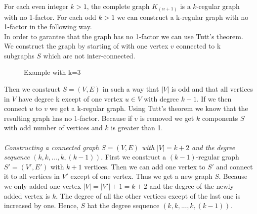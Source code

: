 \documentclass[a4paper]{article}
\begin{document}
	\newpage
	\begin{solution}{11}
		For each even integer $k > 1$, the complete graph $K_{(n+1)}$ is a $k$-regular graph with no 1-factor. 
		For each odd $k > 1$ we can construct a k-regular graph with no 1-factor in the following way. \\
		In order to garantee that the graph has no 1-factor we can use Tutt's theorem. 
		We construct the graph by starting of with one vertex $v$ connected to k subgraphs $S$ which are not inter-connected. 
		\begin{figure}[h]
			\centering
		\caption{Example with k=3}
		\end{figure}
		Then we construct $S=(V,E)$ in such a way that $|V|$ is odd and that all vertices in $V$ have degree k except of one vertex $u \in V$ with degree $k-1$. 
		If we then connect $u$ to $v$ we get a k-regular graph. 
		Using Tutt's theorem we know that the resulting graph has no 1-factor. 
		Because if $v$ is removed we get $k$ components $S$ with odd number of vertices and $k$ is greater than 1.\\ \\
		
		\emph{Constructing a connected graph $S=(V,E)$ with $|V|=k+2$ and the degree sequence $( k,k,...,k,(k-1))$. }  
		First we construct a $(k-1)$-regular graph $S' = (V',E')$ with $k+1$ vertices. 
		Then we can add one vertex to $S'$ and connect it to all vertices in $V'$ except of one vertex. 
		Thus we get a new graph $S$. 
		Because we only added one vertex $|V| = |V'| +1 = k+2$ and the degree of the newly added vertex is $k$.
		The degree of all the other vertices except of the last one is increased by one. 
		Hence, $S$ hat the degree sequence $(k,k,...,k,(k-1))$. 
		\begin{figure}[h]
			\centering
\end{figure}
\end{solution}
\end{document}
